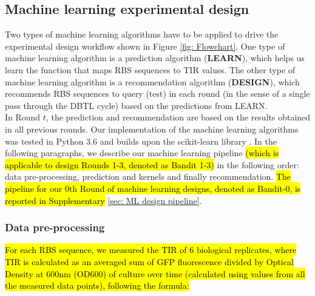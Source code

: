 \subsection{Machine learning experimental design}

Two types of machine learning algorithms have to be applied to drive the experimental design workflow shown in Figure \ref{fig: Flowchart}.
One type of machine learning algorithm is a prediction algorithm (\textbf{LEARN}), which helps us learn the function that maps RBS sequences to TIR values. The other type of machine learning algorithm is a recommendation algorithm (\textbf{DESIGN}), which recommends RBS sequences to query (test) in each round (in the sense of a single pass through the DBTL cycle) based on the predictions from LEARN. \\

In Round $t$, the prediction and recommendation are based on the results obtained in all previous rounds.
Our implementation of the machine learning algorithms was tested in Python 3.6 and builds upon the scikit-learn library \cite{scikit-learn}.
In the following paragraphs, we describe our machine learning pipeline \hl{(which is applicable to design Rounds 1-3, denoted as Bandit 1-3)} in the following order: data pre-processing, prediction and kernels and finally recommendation.
\hl{The pipeline for our 0th Round of machine learning designs, denoted as Bandit-0, is reported in Supplementary} \ref{sec: ML design pipeline}.

\subsubsection{Data pre-processing}
\label{sec: method data pre-procesing}

\hl{For each RBS sequence, we measured the TIR of 6 biological replicates, where TIR is calculated as an averaged sum of GFP fluorescence divided by Optical Density at 600nm (OD600) of culture over time (calculated using values from all the measured data points), following the formula:}

